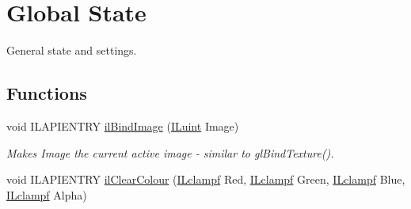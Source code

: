 \hypertarget{group__state}{\section{Global State}
\label{group__state}
}


General state and settings.  


\subsection*{Functions}
\begin{DoxyCompactItemize}
\item 
void I\+L\+A\+P\+I\+E\+N\+T\+R\+Y \hyperlink{group__state_ga1ee59d3004b3fdd25e91da8e41708035}{il\+Bind\+Image} (\hyperlink{group__il__types_gaff8e86a1072c8d7cfe387fb87c6ed8e1}{I\+Luint} Image)
\begin{DoxyCompactList}\small\item\em Makes Image the current active image -\/ similar to gl\+Bind\+Texture(). \end{DoxyCompactList}\item 
\hypertarget{group__state_gaca1dc7f7b8e61eb134060c9c8a8b72f2}{void I\+L\+A\+P\+I\+E\+N\+T\+R\+Y \hyperlink{group__state_gaca1dc7f7b8e61eb134060c9c8a8b72f2}{il\+Clear\+Colour} (\hyperlink{group__il__types_gae90d8075bf3ef2cd89c09b26fd4dbef2}{I\+Lclampf} Red, \hyperlink{group__il__types_gae90d8075bf3ef2cd89c09b26fd4dbef2}{I\+Lclampf} Green, \hyperlink{group__il__types_gae90d8075bf3ef2cd89c09b26fd4dbef2}{I\+Lclampf} Blue, \hyperlink{group__il__types_gae90d8075bf3ef2cd89c09b26fd4dbef2}{I\+Lclampf} Alpha)}\label{group__state_gaca1dc7f7b8e61eb134060c9c8a8b72f2}


\end{DoxyCompactItemize}
